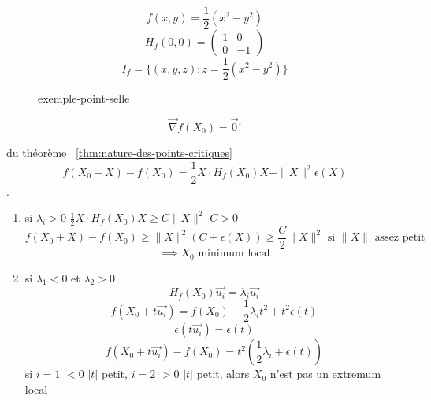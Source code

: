 \begin{eg}
   \[
   f(x, y) = \frac{1}{2}(x^2 - y^2)
   \]  
   \[
       H_f(0, 0) = \begin{pmatrix} 1 & 0\\ 0 & -1 \end{pmatrix} 
   \] 
   \[
       I_f = \{(x, y, z): z = \frac{1}{2}(x^2 - y^2)\}
   \] 
\begin{figure}[H]
    \centering
    \caption{exemple-point-selle}
    \label{fig:exemple-point-selle}
\end{figure}
\end{eg}
\[
    \vec{\nabla }f(X_0) = \vec{0}!
\] 
\begin{preuve} du théorème ~\ref{thm:nature-des-points-critiques}
   \[
       f(X_0 + X) - f(X_0) = \frac{1}{2}X\cdot H_f(X_0)X + \|X\|^2\epsilon(X)
   \]  
   .
   \begin{enumerate}
       \item si $\lambda_i > 0$  $\frac{1}{2}X \cdot H_f(X_0)X \ge C\|X\|^2$ $C > 0$
            \[
           f(X_0 + X) - f(X_0) \ge \|X\|^2(C + \epsilon(X)) \ge \frac{C}{2}\|X\|^2 \text{ si } \|X\| \text{ assez petit }
           \] 
           \[
           \implies X_0 \text{ minimum local}
           \] 
        \item si $\lambda_1 < 0$ et  $\lambda_2 > 0$
             \[
                 H_f(X_0)\vec{u_i} = \lambda_i\vec{u_i}
            \] 
            \[
                f(X_0 + t\vec{u_i}) = f(X_0) + \frac{1}{2} \lambda_it^2 + t^2\epsilon(t)
            \] 
            \[
                \epsilon(t\vec{u_i}) = \epsilon(t)
            \] 
            \[
                f(X_0 + t\vec{u_i}) - f(X_0) = t^2 (\frac{1}{2}\lambda_i + \epsilon(t))
            \] 
            si $i = 1$  $< 0$  $|t|$ petit,  $i = 2$  $> 0$  $|t|$ petit, alors  $X_0$ n'est pas un extremum local
   \end{enumerate}
\end{preuve}

